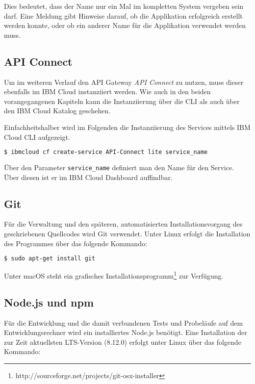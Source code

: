 Dies bedeutet, dass der Name nur ein Mal im kompletten System vergeben sein darf. Eine Meldung gibt Hinweise darauf, ob
die Applikation erfolgreich erstellt werden konnte, oder ob ein anderer Name für die Applikation verwendet werden muss.

\subsection{API Connect}
\label{subsec:vorbereitung_apiconnect}
Um im weiteren Verlauf den API Gateway \textit{API Connect} zu nutzen, muss dieser ebenfalls im IBM Cloud
instanziiert werden. Wie auch in den beiden vorangegangenen Kapiteln kann die Instanziierung über die CLI als auch
über den IBM Cloud Katalog geschehen.

Einfachheitshalber wird im Folgenden die Instanziierung des Services mittels IBM Cloud CLI aufgezeigt.

\begin{lstlisting}[language=bash, caption=Instanziierung von API Connect, label=Instanziierung von API Connect]
$ ibmcloud cf create-service API-Connect lite service_name
\end{lstlisting}

Über den Parameter \texttt{service\_name} definiert man den Name für den Service. Über diesen ist er im IBM Cloud
Dashboard auffindbar.

\subsection{Git}
Für die Verwaltung und den späteren, automatisierten Installationsvorgang des geschriebenen Quellcodes wird Git verwendet.
Unter Linux erfolgt die Installation des Programmes über das folgende Kommando:

\begin{lstlisting}[language=bash, caption=Installation von Git, label=Installation von Git]
    $ sudo apt-get install git
\end{lstlisting}

Unter macOS steht ein grafisches Installationsprogramm\footnote{http://sourceforge.net/projects/git-osx-installer} zur
Verfügung.

\subsection{Node.js und npm}
Für die Entwicklung und die damit verbundenen Tests und Probeläufe auf dem Entwicklungsrechner wird ein installiertes
Node.js benötigt. Eine Installation der zur Zeit aktuellsten LTS-Version (8.12.0) erfolgt unter Linux über das folgende
Kommando:

